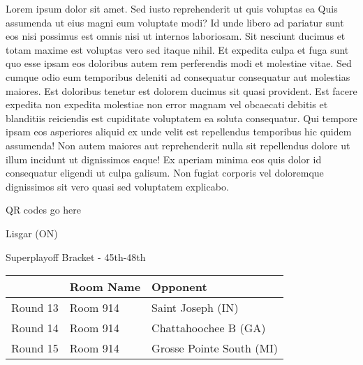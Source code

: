 \documentclass{article}%
\begin{document}
\vspace*{8pt}%
\linebreak%
\newline%
\newline%
Lorem ipsum dolor sit amet. Sed iusto reprehenderit ut quis voluptas ea Quis assumenda ut eius magni eum voluptate modi? Id unde libero ad pariatur sunt eos nisi possimus est omnis nisi ut internos laboriosam. Sit nesciunt ducimus et totam maxime est voluptas vero sed itaque nihil. Et expedita culpa et fuga sunt quo esse ipsam eos doloribus autem rem perferendis modi et molestiae vitae.\newline%
\newline%
Sed cumque odio eum temporibus deleniti ad consequatur consequatur aut molestias maiores. Est doloribus tenetur est dolorem ducimus sit quasi provident. Est facere expedita non expedita molestiae non error magnam vel obcaecati debitis et blanditiis reiciendis est cupiditate voluptatem ea soluta consequatur. Qui tempore ipsam eos asperiores aliquid ex unde velit est repellendus temporibus hic quidem assumenda!\newline%
\newline%
Non autem maiores aut reprehenderit nulla sit repellendus dolore ut illum incidunt ut dignissimos eaque! Ex aperiam minima eos quis dolor id consequatur eligendi ut culpa galisum. Non fugiat corporis vel doloremque dignissimos sit vero quasi sed voluptatem explicabo.\newline%
\newline%
%
\vspace*{30pt}%
\begin{center}%
\begin{Huge}%
QR codes go here%
\end{Huge}%
\end{center}%
\newpage%
\begin{center}%
\begin{Huge}%
Lisgar (ON)%
\end{Huge}%
\vspace*{8pt}%
\linebreak%
\begin{Large}%
Superplayoff Bracket {-} 45th{-}48th%
\end{Large}%
\end{center}%
%
\begin{tabularx}{\textwidth}{|c|Y|Y|}%
\hline%
&Room Name&Opponent\\%
\hline%
Round 13&Room 914&Saint Joseph (IN)\\%
Round 14&Room 914&Chattahoochee B (GA)\\%
Round 15&Room 914&Grosse Pointe South (MI)\\%
\hline%
\end{tabularx}%
\end{document}
